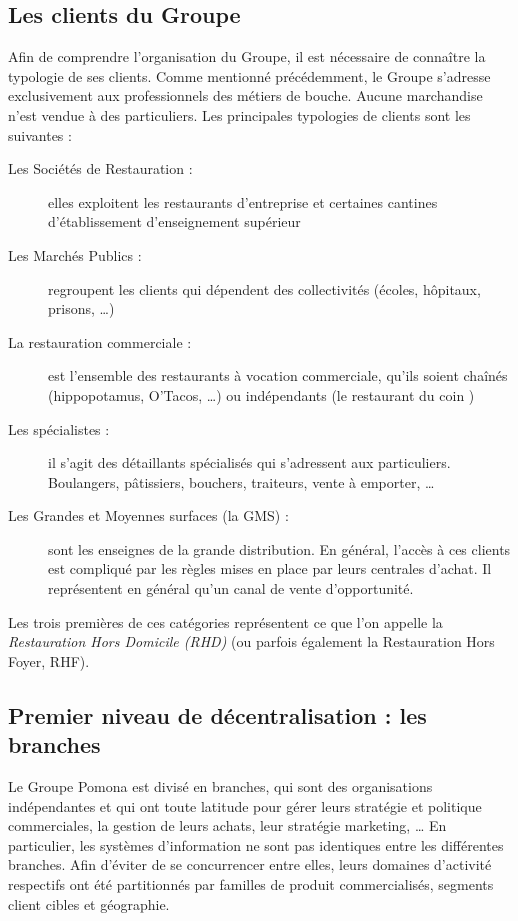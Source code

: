             \subsection{Les clients du Groupe}
            \label{clients}

            Afin de comprendre l'organisation du Groupe, il est nécessaire de connaître la typologie de ses clients.
            Comme mentionné précédemment, le Groupe s'adresse exclusivement aux professionnels des métiers de bouche.
            Aucune marchandise n'est vendue à des particuliers.
            Les principales typologies de clients sont les suivantes : 
            \begin{description}
                \item[Les Sociétés de Restauration :] elles exploitent les restaurants d'entreprise et certaines cantines d'établissement d'enseignement supérieur
                \item[Les Marchés Publics :] regroupent les clients qui dépendent des collectivités (écoles, hôpitaux, prisons, \dots)
                \item[La restauration commerciale :] est l'ensemble des restaurants à vocation commerciale, qu'ils soient chaînés (hippopotamus, O'Tacos, \dots) ou indépendants (\og le restaurant du coin \fg)
                \item[Les spécialistes :] il s'agit des détaillants spécialisés qui s'adressent aux particuliers. Boulangers, pâtissiers, bouchers, traiteurs, vente à emporter, \dots
                \item[Les Grandes et Moyennes surfaces (la GMS) :] sont les enseignes de la grande distribution. En général, l'accès à ces clients est compliqué par les règles mises en place par leurs centrales d'achat. Il représentent en général qu'un canal de vente d'opportunité.
            \end{description}

            Les trois premières de ces catégories représentent ce que l'on appelle la \emph{Restauration Hors Domicile (RHD)} (ou parfois également la Restauration Hors Foyer, RHF).

            \subsection{Premier niveau de décentralisation : les branches}
            \label{les_branches}
            Le Groupe Pomona est divisé en branches, qui sont des organisations indépendantes et qui ont toute latitude pour gérer leurs stratégie et politique commerciales, la gestion de leurs achats, leur stratégie marketing, \dots
            En particulier, les systèmes d'information ne sont pas identiques entre les différentes branches.
            Afin d'éviter de se concurrencer entre elles, leurs domaines d'activité respectifs ont été partitionnés par familles de produit commercialisés, segments client cibles et géographie. 

